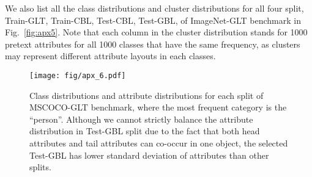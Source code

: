\documentclass{article}
\begin{document}
We also list all the class distributions and cluster distributions for all four split, Train-GLT, Train-CBL, Test-CBL, Test-GBL, of ImageNet-GLT benchmark in Fig.~\ref{fig:apx5}. Note that each column in the cluster distribution stands for 1000 pretext attributes for all 1000 classes that have the same frequency, as clusters may represent different attribute layouts in each classes.






\begin{figure}
   \begin{minipage}[b]{1.0\linewidth}
   \centerline{\texttt{[image: fig/apx\_6.pdf]}}
   \end{minipage}
   \caption{Class distributions and attribute distributions for each split of MSCOCO-GLT benchmark, where the most frequent category is the ``person''. Although we cannot strictly balance the attribute distribution in Test-GBL split due to the fact that both head attributes and tail attributes can co-occur in one object, the selected Test-GBL has lower standard deviation of attributes than other splits.}
   \label{fig:apx6} \end{figure}
\end{document}
